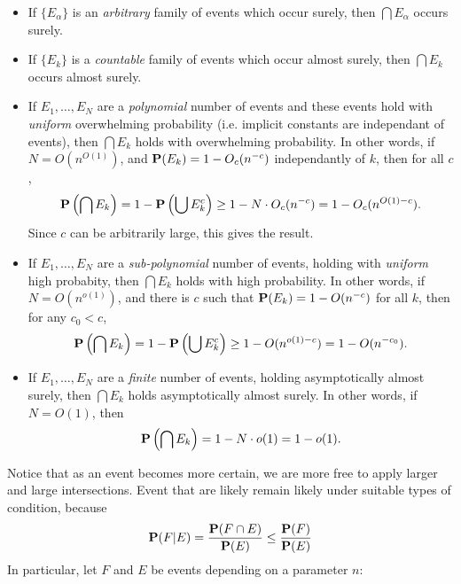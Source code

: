 \begin{itemize}
    \item If $\{ E_\alpha \}$ is an \emph{arbitrary} family of events which occur surely, then $\bigcap E_\alpha$ occurs surely.
    \item If $\{ E_k \}$ is a \emph{countable} family of events which occur almost surely, then $\bigcap E_k$ occurs almost surely.
    \item If $E_1, \dots, E_N$ are a \emph{polynomial} number of events and these events hold with \emph{uniform} overwhelming probability (i.e. implicit constants are independant of events), then $\bigcap E_k$ holds with overwhelming probability. In other words, if $N = O(n^{O(1)})$, and $\mathbf{P}(E_k) = 1 - O_c(n^{-c})$ independantly of $k$, then for all $c$,
    \[ \mathbf{P} \left( \bigcap E_k \right) = 1 - \mathbf{P} \left( \bigcup E_k^c \right) \geq 1 - N \cdot O_c(n^{-c}) = 1 - O_c(n^{O(1) - c}). \]
    Since $c$ can be arbitrarily large, this gives the result.

    \item If $E_1, \dots, E_N$ are a \emph{sub-polynomial} number of events, holding with \emph{uniform} high probabity, then $\bigcap E_k$ holds with high probability. In other words, if $N = O(n^{o(1)})$, and there is $c$ such that $\mathbf{P}(E_k) = 1 - O(n^{-c})$ for all $k$, then for any $c_0 < c$,
    \[ \mathbf{P} \left( \bigcap E_k \right) = 1 - \mathbf{P} \left( \bigcup E_k^c \right) \geq 1 - O(n^{o(1) - c}) = 1 - O(n^{-c_0}). \]

    \item If $E_1, \dots, E_N$ are a \emph{finite} number of events, holding asymptotically almost surely, then $\bigcap E_k$ holds asymptotically almost surely. In other words, if $N = O(1)$, then
    \[ \mathbf{P} \left( \bigcap E_k \right) = 1 - N \cdot o(1) = 1 - o(1). \]
\end{itemize}
%
Notice that as an event becomes more certain, we are more free to apply larger and large intersections. Event that are likely remain likely under suitable types of condition, because
%
\[ \mathbf{P}(F|E) = \frac{\mathbf{P}(F \cap E)}{\mathbf{P}(E)} \leq \frac{\mathbf{P}(F)}{\mathbf{P}(E)} \]
%
In particular, let $F$ and $E$ be events depending on a parameter $n$:
%
